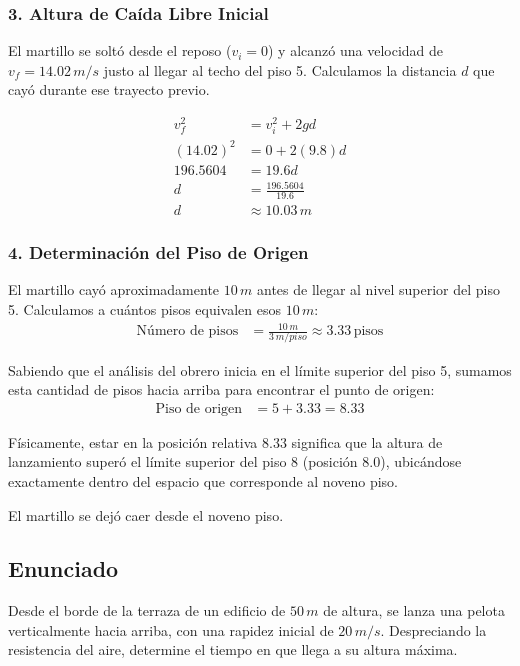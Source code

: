 \documentclass[12pt, a4paper]{article}
\begin{document}
\subsubsection*{3. Altura de Caída Libre Inicial}
El martillo se soltó desde el reposo ($v_i = 0$) y alcanzó una velocidad de $v_f = 14.02 \, \si{m/s}$ justo al llegar al techo del piso 5. Calculamos la distancia $d$ que cayó durante ese trayecto previo.

\begin{align*}
v_f^2 &= v_i^2 + 2 g d \\
(14.02)^2 &= 0 + 2(9.8) d \\
196.5604 &= 19.6 d \\
d &= \frac{196.5604}{19.6} \\
d &\approx 10.03 \, \si{m}
\end{align*}

\subsubsection*{4. Determinación del Piso de Origen}
El martillo cayó aproximadamente $10 \, \si{m}$ antes de llegar al nivel superior del piso 5. Calculamos a cuántos pisos equivalen esos $10 \, \si{m}$:
\begin{align*}
\text{Número de pisos} &= \frac{10 \, \si{m}}{3 \, \si{m/piso}} \approx 3.33 \, \text{pisos}
\end{align*}

Sabiendo que el análisis del obrero inicia en el límite superior del piso 5, sumamos esta cantidad de pisos hacia arriba para encontrar el punto de origen:
\begin{align*}
\text{Piso de origen} &= 5 + 3.33 = 8.33
\end{align*}

Físicamente, estar en la posición relativa $8.33$ significa que la altura de lanzamiento superó el límite superior del piso 8 (posición $8.0$), ubicándose exactamente dentro del espacio que corresponde al noveno piso.

\begin{tcolorbox}[colback=green!5!white, colframe=green!50!black, title=Respuesta Final]
\centering \Large El martillo se dejó caer desde el noveno piso.
\end{tcolorbox}

\newpage

\subsection*{Enunciado}
Desde el borde de la terraza de un edificio de $50 \, \si{m}$ de altura, se lanza una pelota verticalmente hacia arriba, con una rapidez inicial de $20 \, \si{m/s}$. Despreciando la resistencia del aire, determine el tiempo en que llega a su altura máxima.
\end{document}
